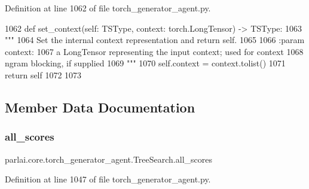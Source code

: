 Definition at line 1062 of file torch\+\_\+generator\+\_\+agent.\+py.


\begin{DoxyCode}
1062     \textcolor{keyword}{def }set\_context(self: TSType, context: torch.LongTensor) -> TSType:
1063         \textcolor{stringliteral}{"""}
1064 \textcolor{stringliteral}{        Set the internal context representation and return self.}
1065 \textcolor{stringliteral}{}
1066 \textcolor{stringliteral}{        :param context:}
1067 \textcolor{stringliteral}{            a LongTensor representing the input context; used for context}
1068 \textcolor{stringliteral}{            ngram blocking, if supplied}
1069 \textcolor{stringliteral}{        """}
1070         self.context = context.tolist()
1071         \textcolor{keywordflow}{return} self
1072 
1073 
\end{DoxyCode}


\subsection{Member Data Documentation}
\mbox{\label{classparlai_1_1core_1_1torch__generator__agent_1_1TreeSearch_ac9e79a3effa48d2e35ac879620cd639e}} 
\subsubsection{\texorpdfstring{all\+\_\+scores}{all\_scores}}
{\footnotesize\ttfamily parlai.\+core.\+torch\+\_\+generator\+\_\+agent.\+Tree\+Search.\+all\+\_\+scores}



Definition at line 1047 of file torch\+\_\+generator\+\_\+agent.\+py.

\mbox{\label{classparlai_1_1core_1_1torch__generator__agent_1_1TreeSearch_a2381c33e5233a5f5c1e50c65ab0ee572}} 
